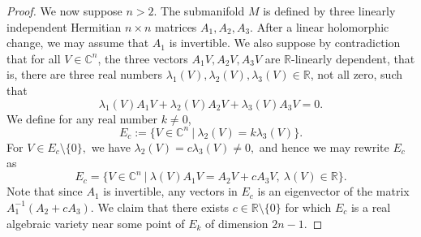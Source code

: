 \documentclass[10pt,a4paper]{amsart}
\newcommand{\C}{\mathbb C}
\newcommand{\R}{\mathbb R}
\numberwithin{equation}{section}
\begin{document}
\begin{proof}
We now suppose $n>2$. The submanifold $M$ is defined by three linearly independent Hermitian $n\times n$ matrices $A_1,A_2,A_3$. 
After a linear holomorphic change, we may assume that $A_1$ is  invertible.  We also suppose by 
contradiction that for all $V\in \C^n$, the three vectors $A_1V,A_2V,A_3V$ are $\R$-linearly dependent, that is, there are three real numbers $\lambda_1(V),\lambda_2(V),\lambda_3(V) \in \R$, not all zero, such that 
\begin{equation}\label{tutu}\lambda_1(V)A_1V+\lambda_2(V)A_2V+\lambda_3(V)A_3V=0.
\end{equation}
We define for any real number $k\neq 0$, 
$$E_c:=\{ V\in \C^n \ | \ \lambda_2(V) =k \lambda_3(V)\}.$$  
For $V  \in E_c \setminus\{0\},$ we have  $\lambda_2(V) =c  \lambda_3(V) \ne 0,$ and hence we may rewrite $E_c$ as 
$$E_c=\{ V\in \C^n \ | \ \lambda(V) A_1V=A_2V+cA_3V, \ \lambda(V) \in \R \}.$$
Note that since  $A_1$ is invertible, any vectors in $E_c$ is an eigenvector of the matrix $A_1^{-1}(A_2+cA_3)$.   
We claim that  there exists $c \in \R\setminus \{0\}$ for which $ E_c$  is  a real  algebraic variety  near some point of $E_k$ of dimension $2n-1$.  


\end{proof}
\end{document}
